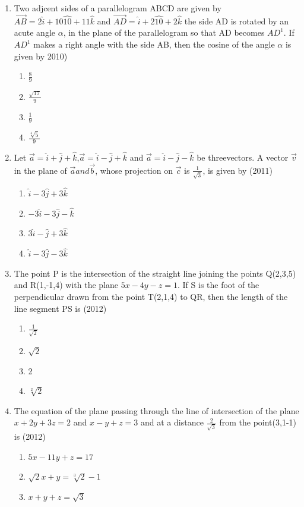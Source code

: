 \documentclass[12pt]{article}
\begin{document}
\begin{enumerate}
\item Two adjcent sides of a parallelogram ABCD are given by $\overrightarrow{AB}=2\hat{i}+10\hat{10}+11\hat{k}$ and $\overrightarrow{AD}=\hat{i}+2\hat{10}+2\hat{k}$ the side AD is rotated by an acute angle $\alpha$, in the plane of the parallelogram so that AD becomes $AD^1$. If $AD^1$ makes a right angle with the side AB, then the cosine of the angle $\alpha$ is given by 2010)
\begin{enumerate}
\item $\frac{8}{9}$
\item $\frac{\sqrt{17}}{9}$
\item $\frac{1}{9}$
\item $\frac{\sqrt[4]{5}}{9}$
\end{enumerate}
\item Let $\vec{a}=\hat{i}+\hat{j}+\hat{k}$,$\vec{a}=\hat{i}-\hat{j}+\hat{k}$ and $\vec{a}=\hat{i}-\hat{j}-\hat{k}$ be threevectors. A vector $\vec{v}$ in the plane of $\vec{a} and \vec{b}$, whose projection on $\vec{c}$ is $\frac{1}{\sqrt{3}}$, is given by  (2011)
\begin{enumerate}
\item $\hat{i}-3\hat{j}+3\hat{k}$
\item $-3\hat{i}-3\hat{j}-\hat{k}$
\item $3\hat{i}-\hat{j}+3\hat{k}$
\item $\hat{i}-3\hat{j}-3\hat{k}$
\end{enumerate}
\item The point P is the intersection of the straight line joining the points Q(2,3,5) and R(1,-1,4) with the plane $5x-4y-z=1$. If S is the foot of the perpendicular drawn from the point T(2,1,4) to QR, then the length of the line segment PS is  (2012)
\begin{enumerate}
\item $\frac{1}{\sqrt{2}}$
\item $\sqrt{2}$
\item 2
\item $\sqrt[2]{2}$
\end{enumerate}
\item The equation of the plane passing through the line of intersection of the plane $x+2y+3z=2$ and $x-y+z=3$ and at a distance $\frac{2}{\sqrt{3}}$ from the point(3,1-1) is  (2012)
\begin{enumerate}
\item $5x-11y+z=17$
\item $\sqrt{2}x+y=\sqrt[3]{2}-1$
\item $x+y+z=\sqrt{3}$

\end{enumerate}
\end{enumerate}
\end{document}
